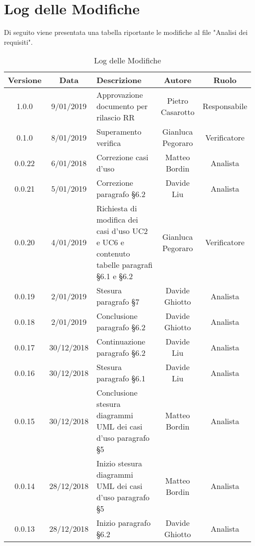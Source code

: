 	\section{Log delle Modifiche}
Di seguito viene presentata una tabella riportante le modifiche al file "Analisi dei requisiti".

\begin{table}[!h] %
            \centering
            \renewcommand{\arraystretch}{2}
            \begin{tabular}{|c|c|p{5cm}|c|c|} %
                \rowcolor{orange!50} %
        		\hline
        		\textbf{Versione} & \textbf{Data} & \textbf{Descrizione} & \textbf{Autore} & \textbf{Ruolo} \\
                \hline
                1.0.0 & 9/01/2019 & Approvazione documento per rilascio RR & Pietro Casarotto & Responsabile \\
                \hline
                0.1.0 & 8/01/2019 & Superamento verifica & Gianluca Pegoraro & Verificatore \\
                \hline
                0.0.22 & 6/01/2018 & Correzione casi d’uso & Matteo Bordin & Analista \\
                \hline
                0.0.21 & 5/01/2019 & Correzione paragrafo §6.2 & Davide Liu & Analista \\
                \hline
                0.0.20 & 4/01/2019 & Richiesta di modifica dei casi d’uso UC2 e UC6 e contenuto tabelle paragrafi §6.1 e §6.2 & Gianluca Pegoraro & Verificatore \\
                \hline
                0.0.19 & 2/01/2019 & Stesura paragrafo §7 & Davide Ghiotto & Analista \\
                \hline
                0.0.18 & 2/01/2019 & Conclusione paragrafo §6.2 & Davide Ghiotto & Analista \\
                \hline
                0.0.17 & 30/12/2018 & Continuazione paragrafo §6.2 & Davide Liu & Analista \\
                \hline
                0.0.16 & 30/12/2018 & Stesura paragrafo §6.1 & Davide Liu & Analista \\
                \hline
                0.0.15 & 30/12/2018 & Conclusione stesura diagrammi UML dei casi d’uso paragrafo §5 & Matteo Bordin & Analista \\
                \hline
                0.0.14 & 28/12/2018 & Inizio stesura diagrammi UML dei casi d'uso paragrafo §5 & Matteo Bordin & Analista \\
                \hline
                0.0.13 & 28/12/2018 & Inizio paragrafo §6.2 & Davide Ghiotto & Analista \\
                \hline
                
        \end{tabular}
        \caption{Log delle Modifiche} %
        \label{tab:Log delle modifiche}
\end{table}

